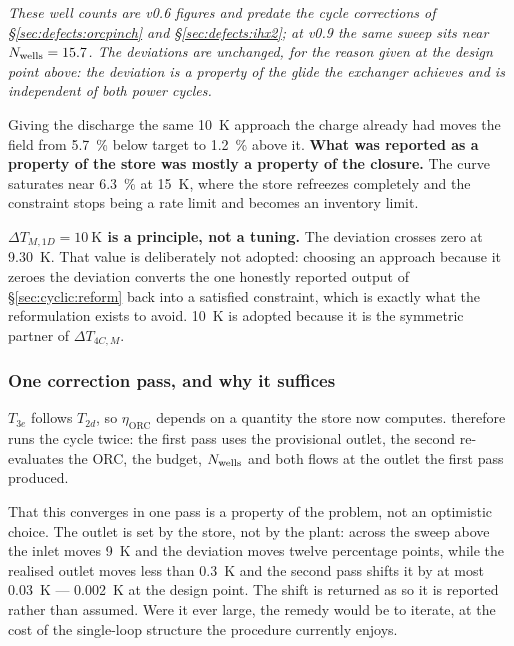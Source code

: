 \noindent
\emph{These well counts are v0.6 figures and predate the cycle corrections of
\S\ref{sec:defects:orcpinch} and \S\ref{sec:defects:ihx2}; at v0.9 the same
sweep sits near $N_{\mathrm{wells}}=15.7$. The deviations are unchanged, for the reason
given at the design point above: the deviation is a property of the glide the
exchanger achieves and is independent of both power cycles.}

\medskip
\noindent
Giving the discharge the same \SI{10}{\kelvin} approach the charge already had
moves the field from \SI{5.7}{\percent} below target to \SI{1.2}{\percent} above
it. \textbf{What was reported as a property of the store was mostly a property
of the closure.} The curve saturates near \SI{+6.3}{\percent} at
\SI{15}{\kelvin}, where the store refreezes completely and the constraint stops
being a rate limit and becomes an inventory limit.

\medskip
\noindent\textbf{$\Delta T_{M,1D}=\SI{10}{\kelvin}$ is a principle, not a
tuning.} The deviation crosses zero at \SI{9.30}{\kelvin}. That value is
deliberately not adopted: choosing an approach because it zeroes the deviation
converts the one honestly reported output of \S\ref{sec:cyclic:reform} back into
a satisfied constraint, which is exactly what the reformulation exists to avoid.
\SI{10}{\kelvin} is adopted because it is the symmetric partner of
$\Delta T_{4C,M}$.

\subsubsection*{One correction pass, and why it suffices}

$T_{3e}$ follows $T_{2d}$, so $\eta_{\mathrm{ORC}}$ depends on a quantity the
store now computes.  therefore runs the cycle
twice: the first pass uses the provisional outlet, the second re-evaluates the
ORC, the budget, $N_{\mathrm{wells}}$ and both flows at the outlet the first pass produced.

That this converges in one pass is a property of the problem, not an optimistic
choice. The outlet is set by the store, not by the plant: across the sweep above
the inlet moves \SI{9}{\kelvin} and the deviation moves twelve percentage
points, while the realised outlet moves less than \SI{0.3}{\kelvin} and the
second pass shifts it by at most \SI{0.03}{\kelvin} --- \SI{0.002}{\kelvin} at
the design point. The shift is returned as  so it is reported
rather than assumed. Were it ever large, the remedy would be to iterate, at the
cost of the single-loop structure the procedure currently enjoys.

